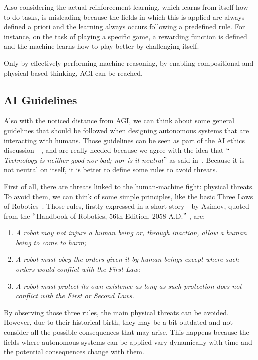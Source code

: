 Also considering the actual reinforcement learning, which learns from itself how to do tasks, is misleading because the fields in which this is applied are always defined a priori and the learning always occurs following a predefined rule. For instance, on the task of playing a specific game, a rewarding function is defined and the machine learns how to play better by challenging itself.

Only by effectively performing machine reasoning, by enabling compositional and physical based thinking, AGI can be reached.

\subsection{AI Guidelines}
\label{aiGuidelines}

Also with the noticed distance from AGI, we can think about some general guidelines that should be followed when designing autonomous systems that are interacting with humans. Those guidelines can be seen as part of the AI ethics discussion~\cite{hibbard2014ethical}~\cite{moor2009four}, and are really needed because we agree with the idea that $``$\textit{Technology is neither good nor bad; nor is it neutral}$"$  as said in~\cite{kranzberg1986technology}. Because it is not neutral on itself, it is better to define some rules to avoid threats.

First of all, there are threats linked to the human-machine fight: physical threats. To avoid them, we can think of some simple principles, like the basic Three Laws of Robotics~\cite{clarke2011asimov}. Those rules, firstly expressed in a short story~\cite{asimov1942runaround}\ by Asimov, quoted from  the $``$Handbook of Robotics, 56th Edition, 2058 A.D.$"$ , are:

\begin{enumerate}
	\item \textit{A robot may not injure a human being or, through inaction, allow a human being to come to harm;}

	\item \textit{A robot must obey the orders given it by human beings except where such orders would conflict with the First Law;}

	\item \textit{A robot must protect its own existence as long as such protection does not conflict with the First or Second Laws.}
\end{enumerate}

By observing those three rules, the main physical threats can be avoided. However, due to their historical birth, they may be a bit outdated and not consider all the possible consequences that may arise. This happens because the fields where autonomous systems can be applied vary dynamically with time and the potential consequences change with them.

